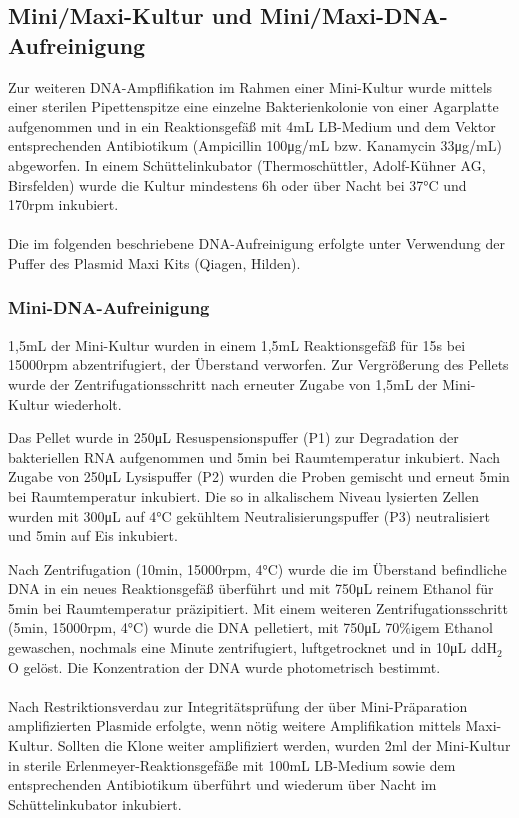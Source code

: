 \subsection{Mini/Maxi-Kultur und Mini/Maxi-DNA-Aufreinigung}
Zur weiteren DNA-Ampflifikation im Rahmen einer Mini-Kultur wurde mittels einer sterilen Pipettenspitze eine einzelne Bakterienkolonie von einer Agarplatte aufgenommen und in ein Reaktionsgefäß mit 4\si{\milli\liter} LB-Medium und dem Vektor entsprechenden Antibiotikum (Ampicillin 100\si{\micro\gram/\milli\liter} bzw. Kanamycin 33\si{\micro\gram/\milli\liter}) abgeworfen.
In einem Schüttelinkubator (Thermoschüttler, Adolf-Kühner AG, Birsfelden) wurde die Kultur mindestens 6\si{\hour} oder über Nacht bei 37\si{\celsius} und 170\si{rpm} inkubiert.
\\
\\
Die im folgenden beschriebene DNA-Aufreinigung erfolgte unter Verwendung der Puffer des Plasmid Maxi Kits (Qiagen, Hilden).

\subsubsection{Mini-DNA-Aufreinigung}
1,5\si{\milli\liter} der Mini-Kultur wurden in einem 1,5\si{\milli\liter} Reaktionsgefäß für 15\si{\second} bei 15000\si{rpm} abzentrifugiert, der Überstand verworfen. Zur Vergrößerung des Pellets wurde der Zentrifugationsschritt nach erneuter Zugabe von 1,5\si{\milli\liter} der Mini-Kultur wiederholt.

Das Pellet wurde in 250\si{\micro\liter} Resuspensionspuffer (P1) zur Degradation der bakteriellen RNA aufgenommen und 5\si{\minute} bei Raumtemperatur inkubiert. Nach Zugabe von 250\si{\micro\liter} Lysispuffer (P2) wurden die Proben gemischt und erneut 5\si{\minute} bei Raumtemperatur inkubiert. Die so in alkalischem Niveau lysierten Zellen wurden mit 300\si{\micro\liter} auf 4\si{\celsius} gekühltem Neutralisierungspuffer (P3) neutralisiert und 5\si{min} auf Eis inkubiert.

Nach Zentrifugation (10\si{\minute}, 15000\si{rpm}, 4\si{\celsius}) wurde die im Überstand befindliche DNA in ein neues Reaktionsgefäß überführt und mit 750\si{\micro\liter} reinem Ethanol für 5\si{\minute} bei Raumtemperatur präzipitiert. Mit einem weiteren Zentrifugationsschritt (5\si{\minute}, 15000\si{rpm}, 4\si{\celsius}) wurde die DNA pelletiert, mit 750\si{\micro\liter} 70\%igem Ethanol gewaschen, nochmals eine Minute zentrifugiert, luftgetrocknet und in 10\si{\micro\liter} ddH$_2$O gelöst.
Die Konzentration der DNA wurde photometrisch bestimmt.
\\
\\
Nach Restriktionsverdau zur Integritätsprüfung der über Mini-Präparation amplifizierten Plasmide erfolgte, wenn nötig weitere Amplifikation mittels Maxi-Kultur. Sollten die Klone weiter amplifiziert werden, wurden 2ml der Mini-Kultur in sterile Erlenmeyer-Reaktionsgefäße mit 100\si{\milli\liter} LB-Medium sowie dem entsprechenden Antibiotikum überführt und wiederum über Nacht im Schüttelinkubator inkubiert.

